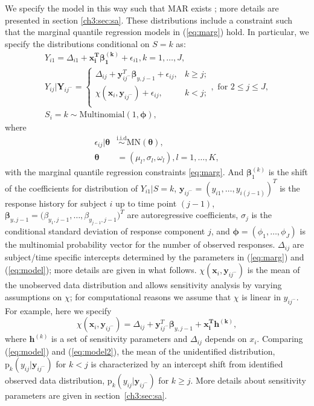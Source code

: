 \documentclass[useAMS,usenatbib,referee]{biom}
\newcommand{\iid}{\stackrel{\mbox{i.i.d}}{\sim}}
\newcommand{\pr}{\mbox{p}}
\begin{document}
We specify the model in this way such that MAR exists \citep{wang2011}; more details are presented in section \ref{ch3:sec:sa}.
These distributions include a constraint such that the marginal quantile regression models in (\ref{eq:marg}) hold.
In particular, we specify the distributions conditional on $S=k$ as:
\begin{equation}
  \begin{array}{l}
      \displaystyle Y_{i1} = \Delta_{i1} +  \bm{x_{i}^T\beta_1^{(k)}} + \epsilon_{i1} , k = 1, \ldots, J,\\
       \displaystyle        Y_{ij}|\bm Y_{ij^{-}} =
      \begin{cases}
        \Delta_{ij} + \bm y_{ij^{-}}^T \bm \beta_{y,j-1} + \epsilon_{ij}, & k \geq j ;  \\
        \chi(\bm x_{i}, \bm y_{ij^{-}}) + \epsilon_{ij}, & k < j ;  \\
      \end{cases}, \mbox{ for } 2 \leq j \leq J,  \\
       S_{i} = k \sim \textrm{Multinomial}(1, \bm \phi),
    \end{array}
  \label{eq:model}
\end{equation}
where
\begin{equation}
\begin{aligned}
\epsilon_{ij} |\bm \theta & \iid \mbox{MN}(\bm \theta),  \\
\bm \theta & = (\mu_l, \sigma_l, \omega_l), l = 1, \ldots, K,
\end{aligned}\label{eq:mixprob}
\end{equation}
with the marginal quantile regression constraints \eqref{eq:marg}.
And $\bm \beta_1^{(k)}$ is the shift of the coefficients for distribution of $Y_{i1} | S = k$,
$\bm y_{ij^{-}} = (y_{i1}, \ldots, y_{i(j-1)})^T$ is the response history for subject $i$ up to time point  $(j-1)$,
$\bm \beta_{y, j-1} = \big(\beta_{y_1, j-1}, \ldots, \beta_{y_{j-1}, j-1} \big)^T$ are autoregressive coefficients,
$\sigma_j$ is the conditional standard deviation of response component $j$, and
$\bm \phi = (\phi_1, \ldots, \phi_J)$ is the multinomial probability vector for the number of observed responses.
$\Delta_{ij}$ are subject/time specific intercepts determined by the parameters in (\ref{eq:marg}) and (\ref{eq:model}); more details are given in what follows.
$\chi(\bm x_{i}, \bm y_{ij^{-}})$ is the mean of the unobserved data distribution and allows sensitivity analysis by varying assumptions on $\chi$; for computational reasons we assume that $\chi$ is linear in $y_{ij^{-}}$.
For example, here we specify
\begin{equation}
\label{eq:model2}
\chi(\bm x_{i}, \bm y_{ij^{-}}) = \Delta_{ij}  + \bm y_{ij^{-}}^T \bm \beta_{y,j-1} + \bm{x_{i}^{T} h^{(k)}} ,
\end{equation}
where $\bm h^{(k)}$ is a set of sensitivity parameters and $\Delta_{ij}$ depends on $x_i$.
Comparing (\ref{eq:model}) and (\ref{eq:model2}), the mean of the unidentified distribution,
$\pr_k(y_{ij}|\bm y_{ij^{-}})$ for $k < j$ is characterized by an intercept shift from identified observed data distribution, $\pr_k(y_{ij}|\bm y_{ij^{-}})$ for $k \geq j$.
More details about sensitivity parameters are given in section~\ref{ch3:sec:sa}.
\end{document}

